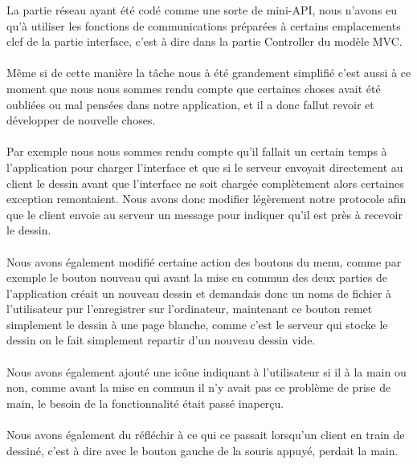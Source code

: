 \documentclass[a4paper,11pt]{article}
\begin{document}
La partie réseau ayant été codé comme une sorte de mini-API, nous n'avons eu qu'à utiliser les fonctions de communications préparées à certains emplacements clef de la partie interface, c'est à dire dans la partie Controller du modèle MVC.

\paragraph{} Même si de cette manière la tâche nous à été grandement simplifié c'est aussi à ce moment que nous nous sommes rendu compte que certaines choses avait été oubliées ou mal pensées dans notre application, et il a donc fallut revoir et développer de nouvelle choses.

\paragraph{} Par exemple nous nous sommes rendu compte qu'il fallait un certain temps à l'application pour charger l'interface et que si le serveur envoyait directement au client le dessin avant que l'interface ne soit chargée complètement alors certaines exception remontaient. Nous avons donc modifier légèrement notre protocole afin que le client envoie au serveur un message pour indiquer qu'il est près à recevoir le dessin.

\paragraph{} Nous avons également modifié certaine action des boutons du menu, comme par exemple le bouton nouveau qui avant la mise en commun des deux parties de l'application créait un nouveau dessin et demandais donc un noms de fichier à l'utilisateur pur l'enregistrer sur l'ordinateur, maintenant ce bouton remet simplement le dessin à une page blanche, comme c'est le serveur qui stocke le dessin on le fait simplement repartir d'un nouveau dessin vide.

\paragraph{} Nous avons également ajouté une icône indiquant à l'utilisateur si il à la main ou non, comme avant la mise en commun il n'y avait pas ce problème de prise de main, le besoin de la fonctionnalité était passé inaperçu.

\paragraph{} Nous avons également du réfléchir à ce qui ce passait lorsqu'un client en train de dessiné, c'est à dire avec le bouton gauche de la souris appuyé, perdait la main.
\end{document}
